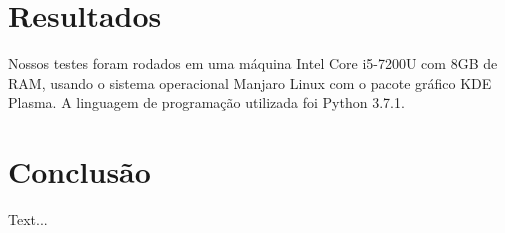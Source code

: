 \documentclass[
	article,			%
	11pt,				%
	oneside,			%
	a4paper,			%
	english,			%
	brazil,				%
	sumario=tradicional
	]{abntex2}
\begin{document}
\section{Resultados}

Nossos testes foram rodados em uma máquina Intel Core i5-7200U com 8GB de RAM, usando o sistema operacional Manjaro Linux com o pacote gráfico KDE Plasma. A linguagem de programação utilizada foi Python 3.7.1.

\section{Conclusão}

Text...
% 

\postextual

%

\end{document}
